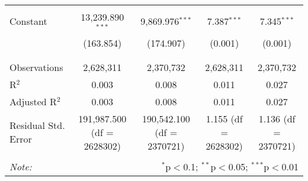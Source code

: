 \begin{table}[H]
{\begin{tabular}{@{\extracolsep{5pt}}lcccc}
   & & & & \\  

  Constant & 13,239.890$^{***}$ & 9,869.976$^{***}$ & 7.387$^{***}$ & 7.345$^{***}$ \\  

   & (163.854) & (174.907) & (0.001) & (0.001) \\  

   & & & & \\  

 \hline \\[-1.8ex]  

 Observations & 2,628,311 & 2,370,732 & 2,628,311 & 2,370,732 \\  

 R$^{2}$ & 0.003 & 0.008 & 0.011 & 0.027 \\  

 Adjusted R$^{2}$ & 0.003 & 0.008 & 0.011 & 0.027 \\  

 Residual Std. Error & 191,987.500 (df = 2628302) & 190,542.100 (df = 2370721) & 1.155 (df = 2628302) & 1.136 (df = 2370721) \\  

 \hline  

 \hline \\[-1.8ex]  

 \textit{Note:}  & \multicolumn{4}{r}{$^{*}$p$<$0.1; $^{**}$p$<$0.05; $^{***}$p$<$0.01} \\  

 \end{tabular}}  

 \end{table}  

 



